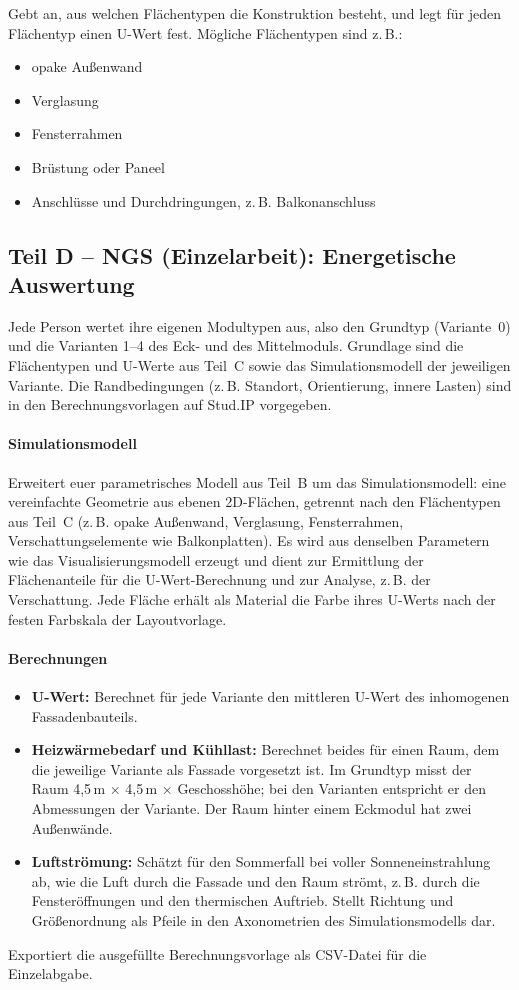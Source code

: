 Gebt an, aus welchen Flächentypen die Konstruktion besteht, und legt für jeden Flächentyp einen U-Wert fest. Mögliche Flächentypen sind z.\,B.:
\begin{itemize}
  \item opake Außenwand
  \item Verglasung
  \item Fensterrahmen
  \item Brüstung oder Paneel
  \item Anschlüsse und Durchdringungen, z.\,B. Balkonanschluss
\end{itemize}
\subsection{Teil D – NGS (Einzelarbeit): Energetische Auswertung}
Jede Person wertet ihre eigenen Modultypen aus, also den Grundtyp (Variante~0) und die Varianten 1–4 des Eck- und des Mittelmoduls. Grundlage sind die Flächentypen und U-Werte aus Teil~C sowie das Simulationsmodell der jeweiligen Variante. Die Randbedingungen (z.\,B. Standort, Orientierung, innere Lasten) sind in den Berechnungsvorlagen auf Stud.IP vorgegeben.
\paragraph{Simulationsmodell}
Erweitert euer parametrisches Modell aus Teil~B um das Simulationsmodell: eine vereinfachte Geometrie aus ebenen 2D-Flächen, getrennt nach den Flächentypen aus Teil~C (z.\,B. opake Außenwand, Verglasung, Fensterrahmen, Verschattungselemente wie Balkonplatten). Es wird aus denselben Parametern wie das Visualisierungsmodell erzeugt und dient zur Ermittlung der Flächenanteile für die U-Wert-Berechnung und zur Analyse, z.\,B. der Verschattung. Jede Fläche erhält als Material die Farbe ihres U-Werts nach der festen Farbskala der Layoutvorlage.
\paragraph{Berechnungen}
\begin{itemize}
  \item \textbf{U-Wert:} Berechnet für jede Variante den mittleren U-Wert des inhomogenen Fassadenbauteils.
  \item \textbf{Heizwärmebedarf und Kühllast:} Berechnet beides für einen Raum, dem die jeweilige Variante als Fassade vorgesetzt ist. Im Grundtyp misst der Raum 4,5\,m × 4,5\,m × Geschosshöhe; bei den Varianten entspricht er den Abmessungen der Variante. Der Raum hinter einem Eckmodul hat zwei Außenwände.
  \item \textbf{Luftströmung:} Schätzt für den Sommerfall bei voller Sonneneinstrahlung ab, wie die Luft durch die Fassade und den Raum strömt, z.\,B. durch die Fensteröffnungen und den thermischen Auftrieb. Stellt Richtung und Größenordnung als Pfeile in den Axonometrien des Simulationsmodells dar.
\end{itemize}
Exportiert die ausgefüllte Berechnungsvorlage als CSV-Datei für die Einzelabgabe.
